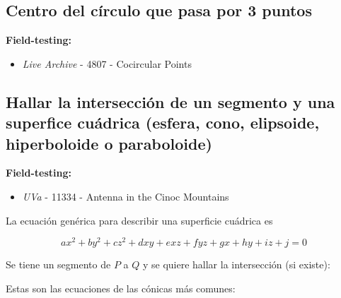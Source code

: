 \documentclass[10pt,letterpaper,twocolumn]{article}
\newcommand{\codigofuente}[1]{

\dotfill
}
\begin{document}
\codigofuente{./src/geometria/check_segment_intersection.cpp}

\subsection{Centro del círculo que pasa por 3 puntos}
\small
\textbf{Field-testing:}
\begin{itemize}
\item \emph{Live Archive} - 4807 - Cocircular Points
\end{itemize}
\normalsize

\codigofuente{./src/geometria/circle_through_3_points.cpp}

\subsection{Hallar la intersección de un segmento y una superfice cuádrica (esfera, cono, elipsoide, hiperboloide o paraboloide)}

\textbf{Field-testing:}
\begin{itemize}
\item \emph{UVa} - 11334 - Antenna in the Cinoc Mountains
\end{itemize}

La ecuación genérica para describir una superficie cuádrica es

$$ ax^2 + by^2 + cz^2 + dxy + exz + fyz + gx + hy + iz + j = 0 $$

Se tiene un segmento de $P$ a $Q$ y se quiere hallar la intersección (si existe):

\codigofuente{./src/geometria/segment_quadric_intersection.cpp}

Estas son las ecuaciones de las cónicas más comunes:

\end{document}
